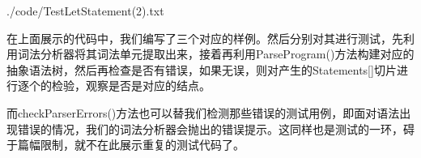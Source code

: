 \documentclass{beamer}
\begin{document}
	\begin{frame}
		
		{./code/TestLetStatement(2).txt}
		
	
	\end{frame}

	\begin{frame}
		在上面展示的代码中，我们编写了三个对应的样例。然后分别对其进行测试，先利用词法分析器将其词法单元提取出来，接着再利用ParseProgram()方法构建对应的抽象语法树，然后再检查是否有错误，如果无误，则对产生的Statements[]切片进行逐个的检验，观察是否是对应的结点。
		
		而checkParserErrors()方法也可以替我们检测那些错误的测试用例，即面对语法出现错误的情况，我们的词法分析器会抛出的错误提示。这同样也是测试的一环，碍于篇幅限制，就不在此展示重复的测试代码了。
		
	\end{frame}
\end{document}
